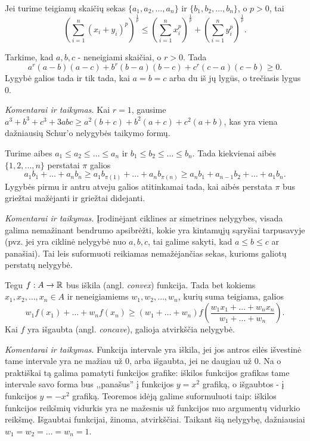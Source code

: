 \begin{thm}[Minkowski]
  Jei turime teigiamų skaičių sekas $\{a_1,a_2,\ldots,a_n\}$ ir
  $\{b_1,b_2,\ldots,b_n\}$, o $p>0$, tai
  $$\left(\sum_{i=1}^{n}{(x_i+y_i)^p}\right)^{\frac{1}{p}}\leq\left(\sum_{i=1}^{n}{x_i^p}\right)^{\frac{1}{p}}+\left(\sum_{i=1}^{n}{y_i^p}\right)^{\frac{1}{p}}.$$
\end{thm}

\begin{thm}[Schur]
  Tarkime, kad $a,b,c$ - neneigiami skaičiai, o $r>0$. Tada
  $$a^r(a-b)(a-c)+b^r(b-a)(b-c)+c^r(c-a)(c-b)\geq0.$$ Lygybė galios tada ir
  tik tada, kai $a=b=c$ arba du iš jų lygūs, o trečiasis lygus 0.
\end{thm}

\noindent \textit{Komentarai ir taikymas.} Kai $r=1$, gausime
$a^3+b^3+c^3+3abc\geq a^2(b+c)+b^2(a+c)+c^2(a+b)$, kas yra viena dažniausių
Schur'o nelygybės taikymo formų.

\begin{thm}
  Turime aibes $a_1\leq a_2\leq\ldots\leq a_n$ ir $b_1\leq b_2\leq\ldots\leq
  b_n$. Tada kiekvienai aibės $\{1,2,\ldots,n\}$ perstatai
  $\pi$ galios $$a_1b_1+\ldots+a_nb_n\geq
  a_1b_{\pi(1)}+\ldots+a_nb_{\pi(n)}\geq a_nb_1+a_{n-1}b_2+\ldots+a_1b_n.$$
  Lygybės pirmu ir antru atveju galios atitinkamai tada, kai aibės perstata
  $\pi$ bus griežtai mažėjanti ir griežtai didejanti.
\end{thm}

\noindent \textit{Komentarai ir taikymas.} Įrodinėjant ciklines ar
simetrines nelygybes, visada galima nemažinant bendrumo apsibrėžti, kokie
yra kintamųjų sąryšiai tarpusavyje (pvz. jei yra ciklinė nelygybė nuo
$a,b,c$, tai galime sakyti, kad $a\leq b\leq c$ ar panašiai). Tai leis
suformuoti reikiamas nemažėjančias sekas, kurioms galiotų perstatų
nelygybė.

\begin{thm}[Jensen]
  Tegu $f:A\rightarrow\mathbb R$ bus iškila (angl. \textit{convex}) funkcija. Tada
  bet kokiems $x_1,x_2,\ldots,x_n\in A$ ir neneigiamiems
  $w_1,w_2,\ldots,w_n$, kurių suma teigiama, galios
  $$w_1f(x_1)+\ldots+w_nf(x_n)\geq(w_1+\ldots+w_n)f\left(\frac{w_1x_1+\ldots+w_nx_n}{w_1+\ldots+w_n}\right).$$
  Kai $f$ yra išgaubta (angl. \textit{concave}), galioja atvirkščia
  nelygybė.
\end{thm}

\noindent \textit{Komentarai ir taikymas.} Funkcija intervale yra iškila,
jei jos antros eilės išvestinė tame intervale yra ne mažiau už $0$, arba
išgaubta, jei ne daugiau už $0$. Na o praktiškai tą galima pamatyti
funkcijos grafike: iškilos funkcijos grafikas tame intervale savo forma bus
,,panašus'' į funkcijos $y=x^2$ grafiką, o išgaubtos - į funkcijos $y=-x^2$
grafiką. Teoremos idėją galime suformuluoti taip: iškilos funkcijos
reikšmių vidurkis yra ne mažesnis už funkcijos nuo argumentų vidurkio
reikšmę.  Išgaubtai funkcijai, žinoma, atvirkščiai. Taikant šią nelygybę,
dažniausiai $w_1=w_2=\ldots=w_n=1$.

\newpage
